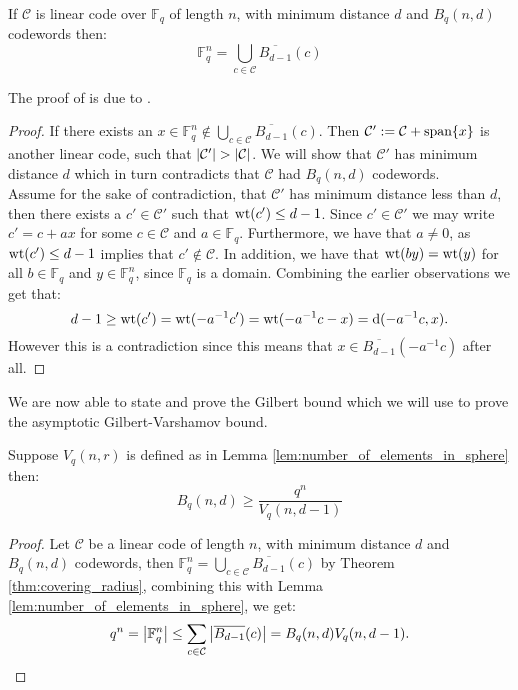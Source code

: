 \begin{theorem}\label{thm:covering_radius}
  If $\mathcal{C}$ is linear code over $\mathbb{F}_{q}$ of length $n$, with minimum distance $d$ and $B_q(n, d)$ codewords then:
  \begin{equation*}
    \mathbb{F}_q^n = \bigcup_{c \in \mathcal{C}} \overline{B_{d - 1}}(c)
  \end{equation*}
\end{theorem}
The proof of is due to \cite{covering_distance_of_linear_code}.
\begin{proof}
  If there exists an $x \in \mathbb{F}_{q}^{n} \not \in \bigcup_{c \in \mathcal{C}} \overline{B_{d - 1}}(c)$. Then $\mathcal{C}' := \mathcal{C} + \textnormal{span}\{x\}$ is another linear code, such that $\left\lvert\mathcal{C}'\right\rvert > \left\lvert\mathcal{C}\right\rvert$. We will show that $\mathcal{C}'$ has minimum distance $d$ which in turn contradicts that $\mathcal{C}$ had $B_{q}(n, d)$ codewords. \\
  Assume for the sake of contradiction, that $\mathcal{C}'$ has minimum distance less than $d$, then there exists a $c' \in \mathcal{C}'$ such that $\mathrm{wt}(c') \leq d - 1$. Since $c' \in \mathcal{C}'$ we may write $c' = c + ax$ for some $c\in \mathcal{C}$ and $a \in \mathbb{F}_{q}$. Furthermore, we have that $a \not= 0$, as $\mathrm{wt}(c') \leq d - 1$ implies that $c' \not\in \mathcal{C}$. In addition, we have that $\mathrm{wt}(b y) = \mathrm{wt}(y)$ for all $b \in \mathbb{F}_q$ and $y\in \mathbb{F}_q^{n}$, since $\mathbb{F}_q$ is a domain. Combining the earlier observations we get that:
   \begin{equation*}
     d - 1 \geq \mathrm{wt}(c') = \mathrm{wt}(-a^{-1}c') = \mathrm{wt}(-a^{-1}c - x) = \mathrm{d}(-a^{-1}c, x).
   \end{equation*}
   However this is a contradiction since this means that $x \in \overline{B_{d - 1}}(-a^{-1}c)$ after all.
 \end{proof}

\newpage
We are now able to state and prove the Gilbert bound which we will use to prove the asymptotic Gilbert-Varshamov bound.
\begin{corollary}\label{cor:gilbert_bound}
  Suppose $V_{q}(n, r)$ is defined as in Lemma \ref{lem:number_of_elements_in_sphere} then:
  \begin{equation*}
    B_q(n, d) \geq \frac{q^{n}}{V_{q}(n, d - 1)}
  \end{equation*}
\end{corollary}

\begin{proof}
  Let $\mathcal{C}$ be a linear code of length $n$, with minimum distance $d$ and $B_q(n, d)$ codewords, then $\mathbb{F}_q^n = \bigcup_{c \in \mathcal{C}} \overline{B_{d - 1}}(c)$ by Theorem \ref{thm:covering_radius}, combining this with Lemma \ref{lem:number_of_elements_in_sphere}, we get:
  \begin{equation*}
    q^{n} = \left\lvert\mathbb{F}_q^n\right\rvert \leq \sum_{c \in \mathcal{C}} \left\lvert\overline{B_{d-1}}(c)\right\rvert = B_q(n,d) V_q(n, d - 1). \qedhere
  \end{equation*}
\end{proof}

